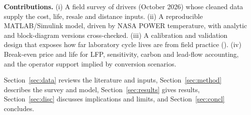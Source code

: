 \textbf{Contributions.} (i) A field survey of \nSurvey{} drivers (October 2026) whose cleaned data supply the cost, life, resale and distance inputs. (ii) A reproducible MATLAB/Simulink model, driven by NASA POWER temperature, with analytic and block-diagram versions cross-checked. (iii) A calibration and validation design that exposes how far laboratory cycle lives are from field practice (). (iv) Break-even price and life for LFP, sensitivity, carbon and lead-flow accounting, and the operator support implied by conversion scenarios.

Section~\ref{sec:data} reviews the literature and inputs, Section~\ref{sec:method} describes the survey and model, Section~\ref{sec:results} gives results, Section~\ref{sec:disc} discusses implications and limits, and Section~\ref{sec:concl} concludes.
